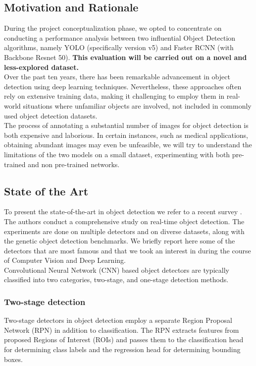 \subsection{Motivation and Rationale}
During the project conceptualization phase, we opted to concentrate on conducting a performance analysis between two influential Object Detection algorithms, namely YOLO (specifically version v5) and Faster RCNN (with Backbone Resnet 50). \textbf{This evaluation will be carried out on a novel and less-explored dataset.}\\
Over the past ten years, there has been remarkable advancement in object detection using deep learning techniques.\cite{kohleretal}
Nevertheless, these approaches often rely on extensive training data, making it challenging to employ them in real-world situations where unfamiliar objects are involved, not included in commonly used object detection datasets.\\ The process of annotating a substantial number of images for object detection is both expensive and laborious. In certain instances, such as medical applications, obtaining abundant images may even be unfeasible, we will try to understand the limitations of the two models on a small dataset, experimenting with both pre-trained and non pre-trained networks.

\subsection{State of the Art}
To present the state-of-the-art in object detection we refer to a recent survey \cite{aranietal}. The authors conduct a comprehensive study on real-time object detection. The experiments are done on multiple detectors and on diverse datasets, along with the genetic object detection benchmarks. We briefly report here some of the detectors that are most famous and that we took an interest in during the course of Computer Vision and Deep Learning.\\

Convolutional Neural Network (CNN) based object detectors are typically
classified into two categories, two-stage, and one-stage detection methods.

\subsubsection{Two-stage detection}
Two-stage detectors in object detection employ a separate Region Proposal Network (RPN) in addition to classification. The RPN extracts features from proposed Regions of Interest (ROIs) and passes them to the classification head for determining class labels and the regression head for determining bounding boxes.\cite{aranietal}

